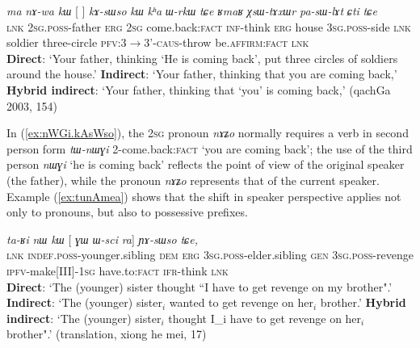 \documentclass[11pt]{article}
\newcommand{\ipa}[1]{{\phon\textit{#1}}} %
\newcommand{\refb}[1]{(\ref{#1})}
\newcommand{\bleu}[1]{{\color{blue}#1}}
\newcommand{\rouge}[1]{{\color{red}#1}}
\begin{document}
\begin{exe}
\ex \label{ex:nWGi.kAsWso}
\gll 
\ipa{ma} \ipa{nɤ-wa}  	\ipa{kɯ}  	[\rouge{\ipa{nɤʑo}} 	\bleu{\ipa{nɯɣi}}]  	\ipa{kɤ-sɯso}  	\ipa{kɯ}  	\ipa{kʰa}  	\ipa{ɯ-rkɯ} \ipa{tɕe} 	\ipa{ʁmaʁ}  	\ipa{χsɯ-tɤxɯr}  	\ipa{pa-sɯ-lɤt}  	\ipa{ɕti}  	\ipa{tɕe}  \\
\textsc{lnk} \textsc{2sg.poss}-father \textsc{erg} \textsc{2sg} {come.back:\textsc{fact}}  \textsc{inf}-think \textsc{erg} house \textsc{3sg.poss}-side \textsc{lnk} soldier three-circle \textsc{pfv:3$\rightarrow$3'-caus}-throw be.\textsc{affirm}:\textsc{fact} \textsc{lnk}\\
\glt \textbf{Direct}: `Your father, thinking `\bleu{He is coming back}',   put three circles of soldiers around the house.' 
\glt  \textbf{Indirect}: `Your father, thinking that \rouge{you are coming back},'
\glt  \textbf{Hybrid indirect}: `Your father, thinking that `\rouge{you}' \bleu{is coming back},' (qachGa 2003, 154)
\end{exe}

In \refb{ex:nWGi.kAsWso}, the \textsc{2sg} pronoun \ipa{nɤʑo} normally requires a verb in second person form \ipa{tɯ-nɯɣi} 2-come.back:\textsc{fact} `you are coming back'; the use of the third person \ipa{nɯɣi} `he is coming back' reflects the point of view of the original speaker (the father), while the pronoun  \ipa{nɤʑo} represents that of the current speaker. Example \refb{ex:tunAmea} shows that the shift in speaker perspective applies not only to pronouns, but also to possessive prefixes.

\begin{exe}
\ex \label{ex:tunAmea}
\gll  \ipa{tɕendɤre}  	\ipa{ta-ʁi}  	\ipa{nɯ}  	\ipa{kɯ}  	[\rouge{\ipa{ɯ-pi}}  	\ipa{ɣɯ}  	\ipa{ɯ-sci}  	\bleu{\ipa{tu-nɤme-a}}  	\ipa{ra}] 	\ipa{ɲɤ-sɯso}  	\ipa{tɕe,}  	\\
\textsc{lnk}  \textsc{indef.poss}-younger.sibling \textsc{dem} \textsc{erg}  {\textsc{3sg.poss}-elder.sibling}  \textsc{gen} \textsc{3sg.poss}-revenge {\textsc{ipfv}-make[III]-\textsc{1sg}} have.to:\textsc{fact} \textsc{ifr}-think \textsc{lnk} \\
\glt  \textbf{Direct}: `The (younger) sister thought ``\bleu{I have to get revenge} on \bleu{my brother}".'
\glt  \textbf{Indirect}:  `The (younger) sister$_i$ \rouge{wanted to get revenge on her$_i$ brother}.'
\glt  \textbf{Hybrid indirect}:  `The (younger) sister$_i$ thought \bleu{I_i have to get revenge} on \rouge{her$_i$ brother}".' (translation, xiong he mei, 17)
\end{exe}
 
\end{document}
